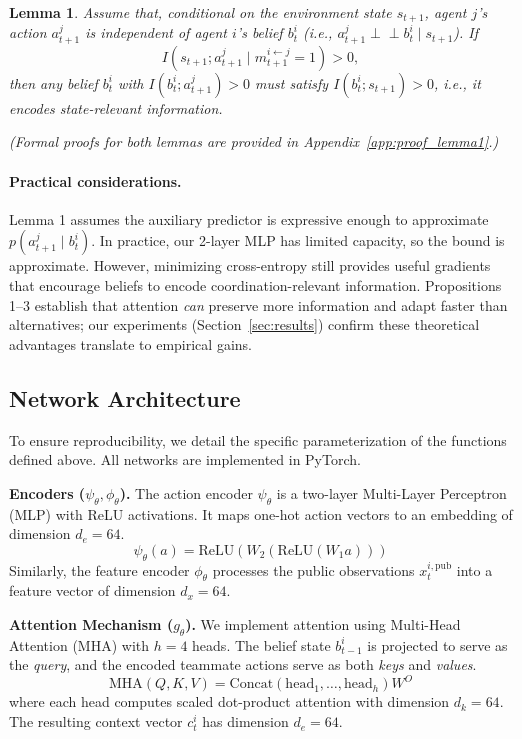 \documentclass{article}
\theoremstyle{plain}
\newtheorem{lemma}[theorem]{Lemma}
\theoremstyle{definition}
\theoremstyle{remark}
\begin{document}
\begin{lemma}
\label{lem:state_relevance}
Assume that, conditional on the environment state $s_{t+1}$, agent $j$'s action $a_{t+1}^j$ is independent of agent $i$'s belief $b_t^i$ (i.e., $a_{t+1}^j \perp\!\!\!\perp b_t^i \mid s_{t+1}$). If
\begin{equation}
  I\!\left( s_{t+1} ; a_{t+1}^j \mid m_{t+1}^{i \leftarrow j} = 1 \right) > 0,
\end{equation}
then any belief $b_t^i$ with $I(b_t^i; a_{t+1}^j) > 0$ must satisfy $I(b_t^i; s_{t+1}) > 0$, i.e., it encodes state-relevant information.
\end{lemma}

\textit{(Formal proofs for both lemmas are provided in Appendix~\ref{app:proof_lemma1}.)}

\paragraph{Practical considerations.}
Lemma 1 assumes the auxiliary predictor is expressive enough to approximate $p(a_{t+1}^j \mid b_t^i)$. In practice, our 2-layer MLP has limited capacity, so the bound is approximate. However, minimizing cross-entropy still provides useful gradients that encourage beliefs to encode coordination-relevant information. Propositions 1--3 establish that attention \emph{can} preserve more information and adapt faster than alternatives; our experiments (Section~\ref{sec:results}) confirm these theoretical advantages translate to empirical gains.

\subsection{Network Architecture}
\label{sec:architecture}

To ensure reproducibility, we detail the specific parameterization of the functions defined above. All networks are implemented in PyTorch.

\textbf{Encoders ($\psi_\theta, \phi_\theta$).}
The action encoder $\psi_\theta$ is a two-layer Multi-Layer Perceptron (MLP) with ReLU activations. It maps one-hot action vectors to an embedding of dimension $d_e = 64$.
\[ \psi_\theta(a) = \mathrm{ReLU}(W_2 (\mathrm{ReLU}(W_1 a))) \]
Similarly, the feature encoder $\phi_\theta$ processes the public observations $x_t^{i,\mathrm{pub}}$ into a feature vector of dimension $d_x = 64$.

\textbf{Attention Mechanism ($g_\theta$).}
We implement attention using Multi-Head Attention (MHA) with $h=4$ heads. The belief state $b_{t-1}^i$ is projected to serve as the \textit{query}, and the encoded teammate actions serve as both \textit{keys} and \textit{values}.
\[ \mathrm{MHA}(Q, K, V) = \mathrm{Concat}(\mathrm{head}_1, \ldots, \mathrm{head}_h)W^O \]
where each head computes scaled dot-product attention with dimension $d_k = 64$. The resulting context vector $c_t^i$ has dimension $d_e = 64$.
\end{document}
